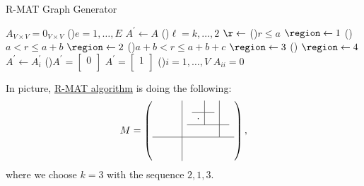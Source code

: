 \begin{algorithm}[H]\label{algo:R-MAT-graph-generator-algo}
	\DontPrintSemicolon{}
	\caption{R-MAT Graph Generator}
	\BlankLine

	\(A_{V\times V} = 0_{V \times V}\) 
	\;
	\For(){\(e= 1, \dots , E\)}{
		\(A^\prime \gets A\)\;
		\For(){\(\ell = k, \dots , 2\)}{
			\(\r\gets \)\rand{\([0, 1]\)} \;
			\uIf(){\(r\leq a\) }{
				\(\region\gets 1\)\;
			}\uElseIf(){\(a < r \leq  a + b\)}{
				\(\region\gets 2\)\;
			}\uElseIf(){\(a + b < r \leq  a + b + c\)}{
				\(\region\gets 3\)\;
			}\Else(){
				\(\region\gets 4\)\;
			}
			\(A^\prime \gets A^\prime_i\)
		}
		\If(){\(A^\prime = \begin{bmatrix}0 \\\end{bmatrix}\)}{
			\(A^\prime = \begin{bmatrix}1 \\ \end{bmatrix}\)
		}
	}
	\;
	\For(){\(i = 1, \dots, V\)}{
		\(A_{ii} = 0\)\label{algo:R-MAT-graph-generator-algo-clean-up}
	}
	\;
\end{algorithm}

\begin{eg}
	In picture, \hyperref[algo:R-MAT-graph-generator-algo]{R-MAT algorithm} is doing the following:
	\[
		M = \left(
		\begin{array}{c|c}
				\begin{array}{cc}
					 & \\
					 &
				\end{array} & \begin{array}{c|c}
					              \begin{array}{c|c}
						      & \\
						\hline
						\cdot &
					\end{array} &    \\
					              \hline
					                                 &
				              \end{array} \\
				\hline
				\begin{array}{cc}
					 & \\
					 &
				\end{array} & \begin{array}{cc}
					               & \\
					               &
				              \end{array}
			\end{array}
		\right),
	\]
	where we choose \(k = 3\) with the sequence \(2, 1, 3\).
\end{eg}

